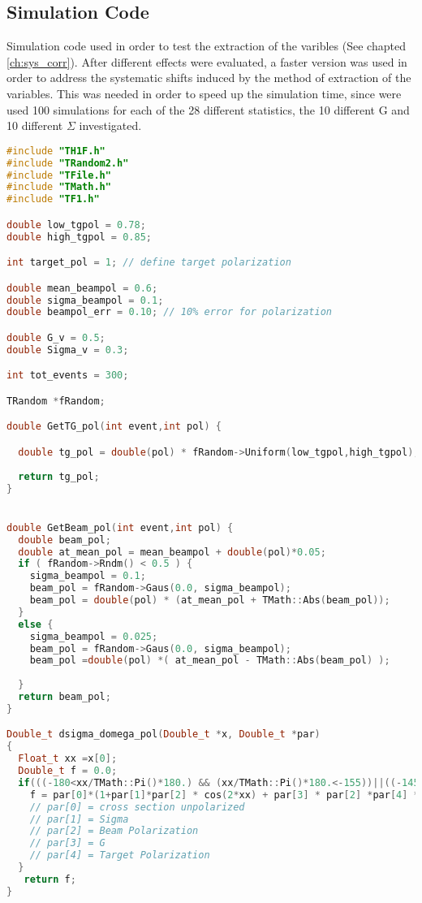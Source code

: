 \FloatBarrier
\subsection{Simulation Code}
\label{app:simcode}
Simulation code used in order to test the extraction of the varibles (See chapted \ref{ch:sys_corr}). After different effects were evaluated, a faster version was used in order to address the systematic shifts induced by the method of extraction of the variables. This was needed in order to speed up the simulation time, since were used 100 simulations for each of the 28 different statistics, the 10 different G and 10 different $\Sigma$ investigated.
\begin{lstlisting}[language=C++]
#include "TH1F.h"
#include "TRandom2.h"
#include "TFile.h"
#include "TMath.h"
#include "TF1.h"

double low_tgpol = 0.78;
double high_tgpol = 0.85;

int target_pol = 1; // define target polarization

double mean_beampol = 0.6;
double sigma_beampol = 0.1;
double beampol_err = 0.10; // 10% error for polarization

double G_v = 0.5;
double Sigma_v = 0.3;

int tot_events = 300;

TRandom *fRandom;

double GetTG_pol(int event,int pol) {

  double tg_pol = double(pol) * fRandom->Uniform(low_tgpol,high_tgpol);
  
  return tg_pol;
}


double GetBeam_pol(int event,int pol) {
  double beam_pol;
  double at_mean_pol = mean_beampol + double(pol)*0.05;
  if ( fRandom->Rndm() < 0.5 ) {
    sigma_beampol = 0.1;
    beam_pol = fRandom->Gaus(0.0, sigma_beampol);
    beam_pol = double(pol) * (at_mean_pol + TMath::Abs(beam_pol));
  }
  else {
    sigma_beampol = 0.025;
    beam_pol = fRandom->Gaus(0.0, sigma_beampol);
    beam_pol =double(pol) *( at_mean_pol - TMath::Abs(beam_pol) );
 
  }
  return beam_pol;
}

Double_t dsigma_domega_pol(Double_t *x, Double_t *par)
{
  Float_t xx =x[0];
  Double_t f = 0.0;
  if(((-180<xx/TMath::Pi()*180.) && (xx/TMath::Pi()*180.<-155))||((-145<xx/TMath::Pi()*180.)&&(xx/TMath::Pi()*180.<-95))||((-85<xx/TMath::Pi()*180.)&&(xx/TMath::Pi()*180.<-35))||((-25<xx/TMath::Pi()*180.)&&(xx/TMath::Pi()*180.<25))||((35<xx/TMath::Pi()*180.)&&(xx/TMath::Pi()*180.<85))||((95<xx/TMath::Pi()*180.)&&(xx/TMath::Pi()*180.<145))||((155<xx/TMath::Pi()*180.)&&(xx/TMath::Pi()*180.<180))){
    f = par[0]*(1+par[1]*par[2] * cos(2*xx) + par[3] * par[2] *par[4] * sin(2*xx));  
    // par[0] = cross section unpolarized
    // par[1] = Sigma
    // par[2] = Beam Polarization
    // par[3] = G
    // par[4] = Target Polarization
  }
   return f;
}



\end{lstlisting}
